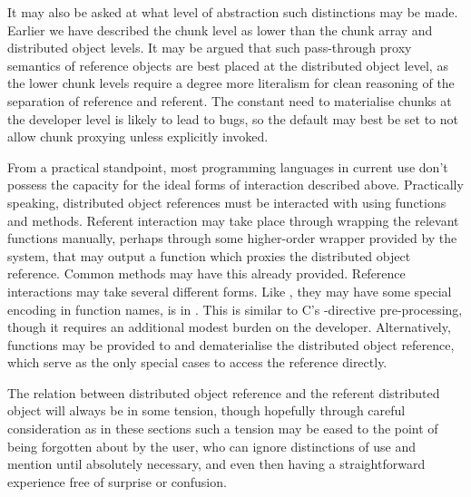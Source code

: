 It may also be asked at what level of abstraction such distinctions may
be made. Earlier we have described the chunk level as lower than the
chunk array and distributed object levels. It may be argued that such
pass-through proxy semantics of reference objects are best placed at the
distributed object level, as the lower chunk levels require a degree
more literalism for clean reasoning of the separation of reference and
referent. The constant need to materialise chunks at the developer level
is likely to lead to bugs, so the default may best be set to not allow
chunk proxying unless explicitly invoked.

From a practical standpoint, most programming languages in current use
don't possess the capacity for the ideal forms of interaction described
above. Practically speaking, distributed object references must be
interacted with using functions and methods. Referent interaction may
take place through wrapping the relevant functions manually, perhaps
through some higher-order wrapper provided by the system, that may
output a function which proxies the distributed object reference. Common
methods may have this already provided. Reference interactions may take
several different forms. Like , they may have some special encoding
in function names, is in . This is similar to C's
-directive pre-processing, though it requires an additional
modest burden on the developer. Alternatively, functions may be provided
to  and dematerialise the distributed object
reference, which serve as the only special cases to access the reference
directly.

The relation between distributed object reference and the referent
distributed object will always be in some tension, though hopefully
through careful consideration as in these sections such a tension may be
eased to the point of being forgotten about by the user, who can ignore
distinctions of use and mention until absolutely necessary, and even
then having a straightforward experience free of surprise or confusion.
